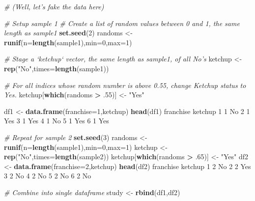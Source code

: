 \documentclass[
]{book}
\newenvironment{Shaded}{\begin{snugshade}}{\end{snugshade}}
\newcommand{\CommentTok}[1]{\textcolor[rgb]{0.56,0.35,0.01}{\textit{#1}}}
\newcommand{\DataTypeTok}[1]{\textcolor[rgb]{0.13,0.29,0.53}{#1}}
\newcommand{\DecValTok}[1]{\textcolor[rgb]{0.00,0.00,0.81}{#1}}
\newcommand{\FloatTok}[1]{\textcolor[rgb]{0.00,0.00,0.81}{#1}}
\newcommand{\KeywordTok}[1]{\textcolor[rgb]{0.13,0.29,0.53}{\textbf{#1}}}
\newcommand{\NormalTok}[1]{#1}
\newcommand{\OperatorTok}[1]{\textcolor[rgb]{0.81,0.36,0.00}{\textbf{#1}}}
\newcommand{\StringTok}[1]{\textcolor[rgb]{0.31,0.60,0.02}{#1}}
\begin{document}
\begin{Shaded}
\begin{Highlighting}[]
\CommentTok{# (Well, let's fake the data here)}

\CommentTok{# Setup sample 1}
\CommentTok{# Create a list of random values between 0 and 1, the same length as sample1}
\KeywordTok{set.seed}\NormalTok{(}\DecValTok{2}\NormalTok{)}
\NormalTok{randoms <-}\StringTok{ }\KeywordTok{runif}\NormalTok{(}\DataTypeTok{n=}\KeywordTok{length}\NormalTok{(sample1),}\DataTypeTok{min=}\DecValTok{0}\NormalTok{,}\DataTypeTok{max=}\DecValTok{1}\NormalTok{)}

\CommentTok{# Stage a `ketchup` vector, the same length as sample1, of all No's}
\NormalTok{ketchup <-}\StringTok{ }\KeywordTok{rep}\NormalTok{(}\StringTok{"No"}\NormalTok{,}\DataTypeTok{times=}\KeywordTok{length}\NormalTok{(sample1))}

\CommentTok{# For all indices whose random number is above 0.55, change Ketchup status to Yes.}
\NormalTok{ketchup[}\KeywordTok{which}\NormalTok{(randoms }\OperatorTok{>}\StringTok{ }\FloatTok{.55}\NormalTok{)] <-}\StringTok{ "Yes"}

\NormalTok{df1 <-}\StringTok{ }\KeywordTok{data.frame}\NormalTok{(}\DataTypeTok{franchise=}\DecValTok{1}\NormalTok{,ketchup)}
\KeywordTok{head}\NormalTok{(df1)}
\NormalTok{  franchise ketchup}
\DecValTok{1}         \DecValTok{1}\NormalTok{      No}
\DecValTok{2}         \DecValTok{1}\NormalTok{     Yes}
\DecValTok{3}         \DecValTok{1}\NormalTok{     Yes}
\DecValTok{4}         \DecValTok{1}\NormalTok{      No}
\DecValTok{5}         \DecValTok{1}\NormalTok{     Yes}
\DecValTok{6}         \DecValTok{1}\NormalTok{     Yes}

\CommentTok{# Repeat for sample 2}
\KeywordTok{set.seed}\NormalTok{(}\DecValTok{3}\NormalTok{)}
\NormalTok{randoms <-}\StringTok{ }\KeywordTok{runif}\NormalTok{(}\DataTypeTok{n=}\KeywordTok{length}\NormalTok{(sample1),}\DataTypeTok{min=}\DecValTok{0}\NormalTok{,}\DataTypeTok{max=}\DecValTok{1}\NormalTok{)}
\NormalTok{ketchup <-}\StringTok{ }\KeywordTok{rep}\NormalTok{(}\StringTok{"No"}\NormalTok{,}\DataTypeTok{times=}\KeywordTok{length}\NormalTok{(sample2))}
\NormalTok{ketchup[}\KeywordTok{which}\NormalTok{(randoms }\OperatorTok{>}\StringTok{ }\FloatTok{.65}\NormalTok{)] <-}\StringTok{ "Yes"}
\NormalTok{df2 <-}\StringTok{ }\KeywordTok{data.frame}\NormalTok{(}\DataTypeTok{franchise=}\DecValTok{2}\NormalTok{,ketchup)}
\KeywordTok{head}\NormalTok{(df2)}
\NormalTok{  franchise ketchup}
\DecValTok{1}         \DecValTok{2}\NormalTok{      No}
\DecValTok{2}         \DecValTok{2}\NormalTok{     Yes}
\DecValTok{3}         \DecValTok{2}\NormalTok{      No}
\DecValTok{4}         \DecValTok{2}\NormalTok{      No}
\DecValTok{5}         \DecValTok{2}\NormalTok{      No}
\DecValTok{6}         \DecValTok{2}\NormalTok{      No}

\CommentTok{# Combine into single dataframe}
\NormalTok{study <-}\StringTok{ }\KeywordTok{rbind}\NormalTok{(df1,df2)}
\end{Highlighting}
\end{Shaded}
\end{document}
